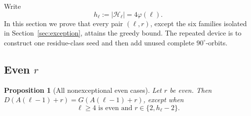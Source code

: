 \documentclass[11pt]{article}
\newtheorem{proposition}[theorem]{Proposition}
\theoremstyle{definition}
\newcommand{\HH}{\mathcal H}
\newcommand{\ph}{\varphi}
\begin{document}
Write
\[
h_\ell:=|\HH_\ell|=4\ph(\ell).
\]
In this section we prove that every pair \((\ell,r)\), except the six families isolated in Section~\ref{sec:exception}, attains the greedy bound.  The repeated device is to construct one residue-class seed and then add unused complete \(90^\circ\)-orbits.

\subsection{Even \(r\)}

\begin{proposition}[All nonexceptional even cases]\label{prop:even}
Let \(r\) be even.  Then \(D(A(\ell-1)+r)=G(A(\ell-1)+r)\), except when
\[
\ell\ge4\text{ is even and }r\in\{2,h_\ell-2\}.
\]
\end{proposition}
\end{document}
